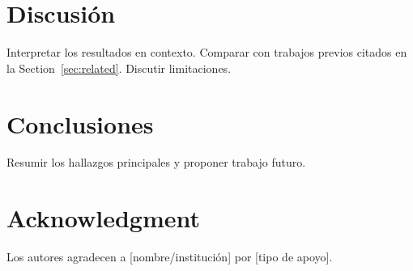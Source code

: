 \documentclass[conference]{IEEEtran}
\begin{document}
\section{Discusión}
\label{sec:discussion}

Interpretar los resultados en contexto. Comparar con trabajos previos
citados en la Section~\ref{sec:related}. Discutir limitaciones.

\section{Conclusiones}
\label{sec:conclusion}

Resumir los hallazgos principales y proponer trabajo futuro.

\section*{Acknowledgment}

Los autores agradecen a [nombre/institución] por [tipo de apoyo].



\end{document}
